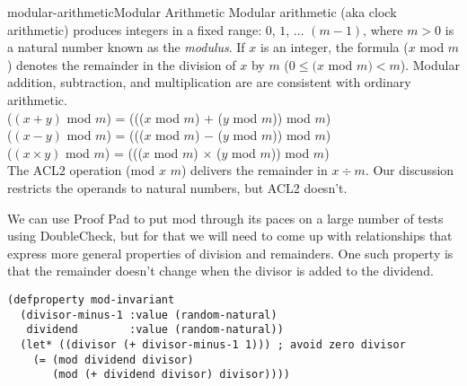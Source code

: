 \begin{aside}{modular-arithmetic}{Modular Arithmetic}
Modular
arithmetic (aka clock arithmetic)
produces integers in a fixed range: $0$, $1$, $\dots$ $(m - 1)$,
where $m > 0$ is a natural number known as the
\emph{modulus}.
If $x$ is an integer, the formula ($x$ mod $m$) denotes
the remainder in the division of $x$ by $m$
($0 \leq (x$ mod $m) < m$).
Modular addition, subtraction, and multiplication are
are consistent with ordinary arithmetic.\\
\hspace*{15mm}($(x + y)$ mod $m$) = ((($x$ mod $m$) $+$ ($y$ mod $m$)) mod $m$) \\
\hspace*{15mm}($(x - y)$ mod $m$) = ((($x$ mod $m$) $-$ ($y$ mod $m$)) mod $m$) \\
\hspace*{15mm}($(x \times y)$ mod $m$) = ((($x$ mod $m$) $\times$ ($y$ mod $m$)) mod $m$)\\
The ACL2 operation
(\textsf{mod} $x$ $m$) delivers the remainder in $x \div m$.
Our discussion restricts the operands to natural numbers,
but ACL2 doesn't.
\end{aside}

We can use Proof Pad to put \textsf{mod}
through its paces on a large number of tests using DoubleCheck,
but for that we will need to come up with relationships
that express more general properties of division and remainders.
One such property is that the remainder doesn't change
when the divisor is added to the dividend.

\begin{code}
\begin{verbatim}
(defproperty mod-invariant
  (divisor-minus-1 :value (random-natural)
   dividend        :value (random-natural))
  (let* ((divisor (+ divisor-minus-1 1))) ; avoid zero divisor
    (= (mod dividend divisor)
       (mod (+ dividend divisor) divisor))))
\end{verbatim}
\end{code}

